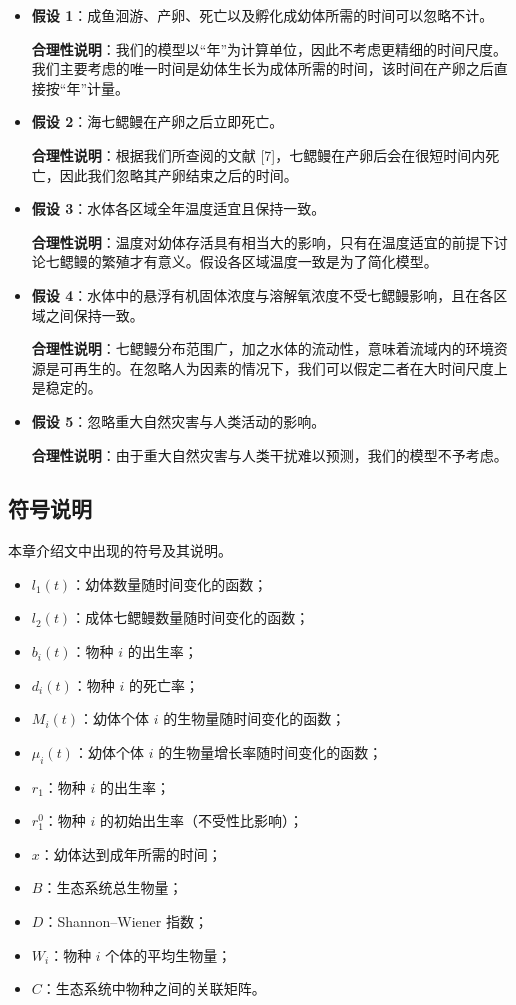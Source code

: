 \documentclass[11pt,a4paper]{ctexart}
\begin{document}
\begin{itemize}
\item \textbf{假设 1}：成鱼洄游、产卵、死亡以及孵化成幼体所需的时间可以忽略不计。

\textbf{合理性说明}：我们的模型以“年”为计算单位，因此不考虑更精细的时间尺度。我们主要考虑的唯一时间是幼体生长为成体所需的时间，该时间在产卵之后直接按“年”计量。
\item \textbf{假设 2}：海七鳃鳗在产卵之后立即死亡。

\textbf{合理性说明}：根据我们所查阅的文献 [7]，七鳃鳗在产卵后会在很短时间内死亡，因此我们忽略其产卵结束之后的时间。
\item \textbf{假设 3}：水体各区域全年温度适宜且保持一致。

\textbf{合理性说明}：温度对幼体存活具有相当大的影响，只有在温度适宜的前提下讨论七鳃鳗的繁殖才有意义。假设各区域温度一致是为了简化模型。
\item \textbf{假设 4}：水体中的悬浮有机固体浓度与溶解氧浓度不受七鳃鳗影响，且在各区域之间保持一致。

\textbf{合理性说明}：七鳃鳗分布范围广，加之水体的流动性，意味着流域内的环境资源是可再生的。在忽略人为因素的情况下，我们可以假定二者在大时间尺度上是稳定的。
\item \textbf{假设 5}：忽略重大自然灾害与人类活动的影响。

\textbf{合理性说明}：由于重大自然灾害与人类干扰难以预测，我们的模型不予考虑。
\end{itemize}

\subsection{符号说明}

本章介绍文中出现的符号及其说明。

\begin{itemize}
\item $l_1(t)$：幼体数量随时间变化的函数；
\item $l_2(t)$：成体七鳃鳗数量随时间变化的函数；
\item $b_i(t)$：物种 $i$ 的出生率；
\item $d_i(t)$：物种 $i$ 的死亡率；
\item $M_i(t)$：幼体个体 $i$ 的生物量随时间变化的函数；
\item $\mu_i(t)$：幼体个体 $i$ 的生物量增长率随时间变化的函数；
\item $r_1$：物种 $i$ 的出生率；
\item $r_1^{0}$：物种 $i$ 的初始出生率（不受性比影响）；
\item $x$：幼体达到成年所需的时间；
\item $B$：生态系统总生物量；
\item $D$：Shannon--Wiener 指数；
\item $W_i$：物种 $i$ 个体的平均生物量；
\item $C$：生态系统中物种之间的关联矩阵。
\end{itemize}
\end{document}
